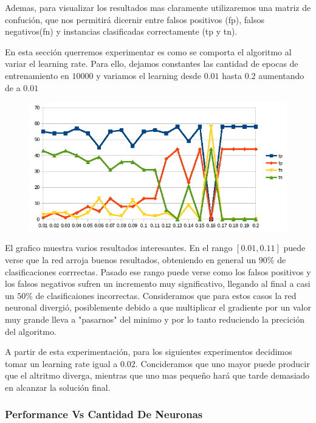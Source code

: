 Ademas, para visualizar los resultados mas claramente utilizaremos una matriz de confución, que nos permitirá dicernir entre falsos positivos (fp), falsos negativos(fn) y instancias clasificadas correctamente (tp y tn).

\reescribir 

En esta sección querremos experimentar es como se comporta el algoritmo al variar el learning rate. Para ello, dejamos constantes las cantidad de epocas de entrenamiento en $10000$ y variamos el learning desde $0.01$ hasta $0.2$ aumentando de a $0.01$

\begin{figure}[h!]
\centering
\includegraphics[scale=0.4]{ej1/test_learning_rate.png}
\end{figure}

El grafico muestra varios resultados interesantes. En el rango $[0.01,0.11]$ puede verse que la red arroja buenos resultados, obteniendo en general un $90\%$ de clasificaciones corrrectas. Pasado ese rango puede verse como los falsos positivos y los falsos negativos sufren un incremento muy significativo, llegando al final a casi un $50\%$ de clasificaiones incorrectas. Consideramos que para estos casos la red neuronal divergió, posiblemente debido a que multiplicar el gradiente por un valor muy grande lleva a "pasarnos" del minimo y por lo tanto reduciendo la precición del algoritmo. \completar

A partir de esta experimentación, para los siguientes experimentos decidimos tomar un learning rate igual a $0.02$. Concideramos que uno mayor puede producir que el altritmo diverga, mientras que uno mas pequeño hará que tarde demasiado en alcanzar la solución final.

\subsubsection{Performance Vs Cantidad De Neuronas} 

